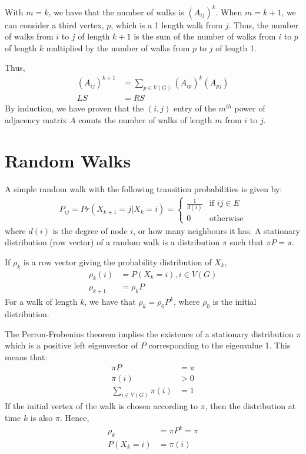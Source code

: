 \documentclass{assignment}
\begin{document}
With $m=k$, we have that the number of walks is $(A_{ij})^k$. When $m=k+1$, we can consider a third vertex, $p$, which is a 1 length walk from $j$. Thus, the number of walks from $i$ to $j$ of length $k+1$ is the sum of the number of walks from $i$ to $p$ of length $k$ multiplied by the number of walks from $p$ to $j$ of length 1. 

Thus,
\begin{align*}
    (A_{ij})^{k+1} &= \sum_{p \in V(G)} (A_{ip})^k (A_{pj}) \\
    LS &= RS
\end{align*}
By induction, we have proven that the $(i, j)$ entry of the $m^{th}$ power of adjacency matrix $A$ counts the number of walks of length $m$ from $i$ to $j$.

\section{Random Walks}
A simple random walk with the following transition probabilities is given by:
\begin{align*}
    P_{ij} = Pr(X_{k+1}=j|X_k=i) = \begin{cases}
        \frac{1}{d(i)} & \text{if } ij \in E \\
        0 & \text{otherwise}
    \end{cases}
\end{align*}
where $d(i)$ is the degree of node $i$, or how many neighbours it has. A stationary distribution (row vector) of a random walk is a distribution $\pi$ such that $\pi P = \pi$. 

If $\rho_k$ is a row vector giving the probability distribution of $X_k$,
\begin{align*}
    \rho_k(i) &= P(X_k=i), i \in V(G) \\
    \rho_{k+1} &= \rho_k P
\end{align*}
For a walk of length $k$, we have that $\rho_k = \rho_0 P^k$, where $\rho_0$ is the initial distribution.

The Perron-Frobenius theorem implies the existence of a stationary distribution $\pi$ which is a positive left eigenvector of $P$ corresponding to the eigenvalue 1. This means that:
\begin{align*}
    \pi P &= \pi \\
    \pi(i) &> 0 \\
    \sum_{i \in V(G)} \pi(i) &= 1
\end{align*}
If the initial vertex of the walk is chosen according to $\pi$, then the distribution at time $k$ is also $\pi$. Hence,
\begin{align*}
    \rho_k &= \pi P^k = \pi \\
    P(X_k=i) &= \pi(i)
\end{align*}
\end{document}
